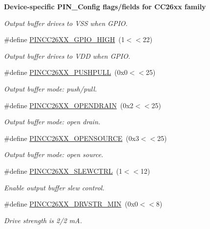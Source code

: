 \begin{Indent}{\bf Device-\/specific P\-I\-N\-\_\-\-Config flags/fields for C\-C26xx family}
\begin{DoxyCompactItemize}
\begin{DoxyCompactList}\small\item\em Output buffer drives to V\-S\-S when G\-P\-I\-O. \end{DoxyCompactList}\item 
\#define \hyperlink{_p_i_n_c_c26_x_x_8h_a92176ec67c16a6b11ba4a809c034656c}{P\-I\-N\-C\-C26\-X\-X\-\_\-\-G\-P\-I\-O\-\_\-\-H\-I\-G\-H}~(1$<$$<$22)
\begin{DoxyCompactList}\small\item\em Output buffer drives to V\-D\-D when G\-P\-I\-O. \end{DoxyCompactList}\item 
\#define \hyperlink{_p_i_n_c_c26_x_x_8h_a49e505c85c98df6615dcb287991d305b}{P\-I\-N\-C\-C26\-X\-X\-\_\-\-P\-U\-S\-H\-P\-U\-L\-L}~(0x0$<$$<$25)
\begin{DoxyCompactList}\small\item\em Output buffer mode\-: push/pull. \end{DoxyCompactList}\item 
\#define \hyperlink{_p_i_n_c_c26_x_x_8h_a853703ea7b1f0e256971d0004bb9253c}{P\-I\-N\-C\-C26\-X\-X\-\_\-\-O\-P\-E\-N\-D\-R\-A\-I\-N}~(0x2$<$$<$25)
\begin{DoxyCompactList}\small\item\em Output buffer mode\-: open drain. \end{DoxyCompactList}\item 
\#define \hyperlink{_p_i_n_c_c26_x_x_8h_a78cb87ea41dd5c40b02f91f118e8782a}{P\-I\-N\-C\-C26\-X\-X\-\_\-\-O\-P\-E\-N\-S\-O\-U\-R\-C\-E}~(0x3$<$$<$25)
\begin{DoxyCompactList}\small\item\em Output buffer mode\-: open source. \end{DoxyCompactList}\item 
\#define \hyperlink{_p_i_n_c_c26_x_x_8h_ab6336729706993f8423acf026dd7e9c0}{P\-I\-N\-C\-C26\-X\-X\-\_\-\-S\-L\-E\-W\-C\-T\-R\-L}~(1$<$$<$12)
\begin{DoxyCompactList}\small\item\em Enable output buffer slew control. \end{DoxyCompactList}\item 
\#define \hyperlink{_p_i_n_c_c26_x_x_8h_abb5efea898dfb62cd3723c9c106c7ee9}{P\-I\-N\-C\-C26\-X\-X\-\_\-\-D\-R\-V\-S\-T\-R\-\_\-\-M\-I\-N}~(0x0$<$$<$8)
\begin{DoxyCompactList}\small\item\em Drive strength is 2/2 m\-A. \end{DoxyCompactList}\item 

\end{DoxyCompactItemize}
\end{Indent}
